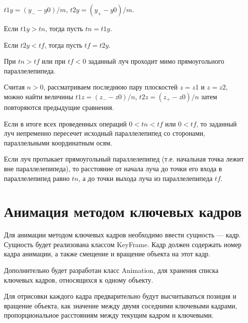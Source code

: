 $t1y = (y_{-} - y0)/m$, $t2y = (y_{+} - y0)/m$.

Если $t1y > tn$, тогда пусть $tn = t1y$.

Если $t2y < tf$, тогда пусть $tf = t2y$.

При $tn > tf$ или при $tf < 0$ заданный луч проходит мимо прямоугольного параллелепипеда.

Считая $n > 0$, рассматриваем последнюю пару плоскостей $z = z$1 и $z = z2 $, можно найти величины $t1z = (z_{-} - z0)/n$, $t2z = (z_{+} - z0)/n$ затем повторяются предыдущие сравнения.

Если в итоге всех проведенных операций $0 < tn < tf$ или
$0 < tf$, то заданный луч непременно пересечет исходный параллелепипед со сторонами, параллельными координатным осям.

Если луч протыкает прямоугольный параллелепипед (т.е. начальная точка лежит вне параллелепипеда), то расстояние от начала луча до точки его входа в параллелепипед равно $tn$, а до точки выхода луча из параллелепипеда $tf$.

\section{Анимация методом ключевых кадров}

Для анимации методом ключевых кадров необходимо ввести сущность --- кадр. Сущность будет реализована классом KeyFrame. Кадр должен содержать номер кадра анимации, а также смещение и вращение объекта на этот кадр.

Дополнительно будет разработан класс Animation, для хранения списка ключевых кадров, относящихся к одному объекту.

Для отрисовки каждого кадра предварительно будут высчитываться позиция и вращение объекта, как значение между двумя соседними ключевыми кадрами, пропорциональное расстояниям между текущим кадром и ключевыми.